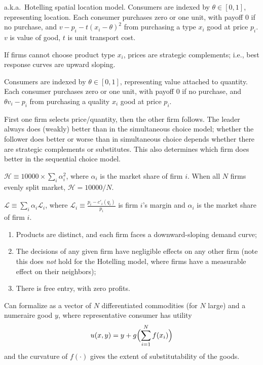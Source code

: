 \documentclass[8pt,letterpaper, landscape]{extarticle} %
\begin{document}
\begin{multicols}{3}
\begin{description}
 a.k.a.\ Hotelling spatial location model. Consumers are indexed by $ \theta \in [0,1] $, representing location. Each consumer purchases zero or one unit, with payoff $ 0 $ if no purchase, and $ v - p_i - t (x_i - \theta)^2 $ from purchasing a type $ x_i $ good at price $ p_i $. $ v $ is value of good, $ t $ is unit transport cost.

If firms cannot choose product type $ x_i $, prices are strategic complements; i.e., best response curves are upward sloping.

 Consumers are indexed by $ \theta \in [0,1] $, representing value attached to quantity. Each consumer purchases zero or one unit, with payoff $ 0 $ if no purchase, and $ \theta v_i - p_i $ from purchasing a quality $ x_i $ good at price $ p_i $.

 First one firm selects price/quantity, then the other firm follows. The leader always does (weakly) better than in the simultaneous choice model; whether the follower does better or worse than in simultaneous choice depends whether there are strategic complements or substitutes. This also determines which firm does better in the sequential choice model.

 $ \mathcal{H} \equiv 10000 \times \sum_i \alpha_i^2 $, where $ \alpha_i $ is the market share of firm $ i $. When all $ N $ firms evenly split market, $ \mathcal{H} = 10000 / N $.

 $ \mathcal{L} \equiv \sum_i \alpha_i \mathcal{L}_i $, where $ \mathcal{L}_i \equiv \frac{p_i - c'_i (q_i)}{p_i} $ is firm $ i $'s margin and $ \alpha_i $ is the market share of firm $ i $.

\begin{enumerate}
\item Products are distinct, and each firm faces a downward-sloping demand curve;
\item The decisions of any given firm have negligible effects on any other firm (note this does \textit{not} hold for the Hotelling model, where firms have a measurable effect on their neighbors);
\item There is free entry, with zero profits.
\end{enumerate}
Can formalize as a vector of $ N $ differentiated commodities (for $ N $ large) and a numeraire good $ y $, where representative consumer has utility
\[ u(x, y) = y + g \Bigl(  \sum_{i=1}^{N} f(x_i) \Bigr) \]
and the curvature of $ f(\cdot) $ gives the extent of substitutability of the goods.


\end{description}
\end{multicols}
\end{document}
